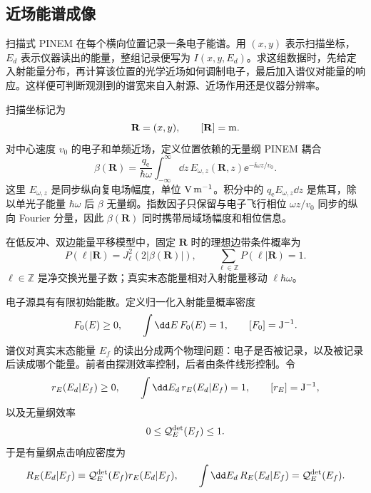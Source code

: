 \subsection{近场能谱成像}\label{subsec:nearfield-spectrum-imaging-dp19}

扫描式 PINEM 在每个横向位置记录一条电子能谱。用 $(x,y)$ 表示扫描坐标，$E_d$ 表示仪器读出的能量，整组记录便写为 $I(x,y,E_d)$。求这组数据时，先给定入射能量分布，再计算该位置的光学近场如何调制电子，最后加入谱仪对能量的响应。这样便可判断观测到的谱宽来自入射源、近场作用还是仪器分辨率。

扫描坐标记为
\begin{equation*}
\mathbf R=(x,y),
\qquad [\mathbf R]={\rm m}.
\end{equation*}
对中心速度 $v_0$ 的电子和单频近场，定义位置依赖的无量纲 PINEM 耦合
\begin{equation}
\boxed{
\beta(\mathbf R)
=\frac{q_{\mathrm e}}{\hbar\omega}
\int_{-\infty}^{\infty}\dd z\,
E_{\omega,z}(\mathbf R,z)
\ee^{-\ii\omega z/v_0}.}
\label{eq:pinem-spatial-beta-dp19}
\end{equation}
这里 $E_{\omega,z}$ 是同步纵向复电场幅度，单位 ${\rm V\,m^{-1}}$。积分中的 $q_{\mathrm e} E_{\omega,z}\dd z$ 是焦耳，除以单光子能量 $\hbar\omega$ 后 $\beta$ 无量纲。指数因子只保留与电子飞行相位 $\omega z/v_0$ 同步的纵向 Fourier 分量，因此 $\beta(\mathbf R)$ 同时携带局域场幅度和相位信息。

在低反冲、双边能量平移模型中，固定 $\mathbf R$ 时的理想边带条件概率为
\begin{equation*}
P(\ell|\mathbf R)
=J_\ell^2(2|\beta(\mathbf R)|),
\qquad
\sum_{\ell\in\mathbb Z}P(\ell|\mathbf R)=1.
\end{equation*}
$\ell\in\mathbb Z$ 是净交换光量子数；真实末态能量相对入射能量移动 $\ell\hbar\omega$。

电子源具有有限初始能散。定义归一化入射能量概率密度
\begin{equation*}
F_0(E)\ge0,
\qquad
\int\dd E\,F_0(E)=1,
\qquad
[F_0]={\rm J^{-1}}.
\end{equation*}
谱仪对真实末态能量 $E_f$ 的读出分成两个物理问题：电子是否被记录，以及被记录后读成哪个能量。前者由探测效率控制，后者由条件线形控制。令
\begin{equation*}
r_E(E_d|E_f)\ge0,
\qquad
\int\dd E_d\,r_E(E_d|E_f)=1,
\qquad
[r_E]={\rm J^{-1}},
\end{equation*}
以及无量纲效率
\begin{equation*}
0\le\mathcal Q_E^{\rm det}(E_f)\le1.
\end{equation*}
于是有量纲点击响应密度为
\begin{equation*}
R_E(E_d|E_f)
\equiv\mathcal Q_E^{\rm det}(E_f)r_E(E_d|E_f),
\qquad
\int\dd E_d\,R_E(E_d|E_f)=\mathcal Q_E^{\rm det}(E_f).
\end{equation*}

